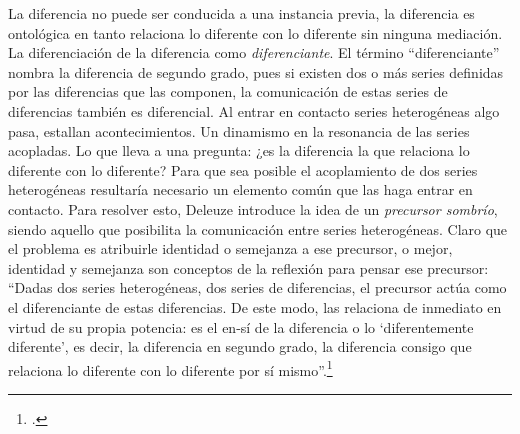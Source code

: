 La diferencia no puede ser conducida a una instancia previa, la diferencia es ontológica en tanto relaciona lo diferente con lo diferente sin ninguna mediación. La diferenciación de la diferencia como \emph{diferenciante}. El término \enquote{diferenciante} nombra la diferencia de segundo grado, pues si existen dos o más series definidas por las diferencias que las componen, la comunicación de estas series de diferencias también es diferencial. Al entrar en contacto series heterogéneas algo pasa, estallan acontecimientos. Un dinamismo en la resonancia de las series acopladas. Lo que lleva a una pregunta: ¿es la diferencia la que relaciona lo diferente con lo diferente? Para que sea posible el acoplamiento de dos series heterogéneas resultaría necesario un elemento común que las haga entrar en contacto. Para resolver esto, Deleuze introduce la idea de un \emph{precursor sombrío}, siendo aquello que posibilita la comunicación entre series heterogéneas. Claro que el problema es atribuirle identidad o semejanza a ese precursor, o mejor, identidad y semejanza son conceptos de la reflexión para pensar ese precursor: \enquote{Dadas dos series heterogéneas, dos series de diferencias, el precursor actúa como el diferenciante de estas diferencias. De este modo, las relaciona de inmediato en virtud de su propia potencia: es el en-sí de la diferencia o lo \enquote{diferentemente diferente}, es decir, la diferencia en segundo grado, la diferencia consigo que relaciona lo diferente con lo diferente por sí mismo}.\footcite[186]{@6961-DELEUZE2002}

